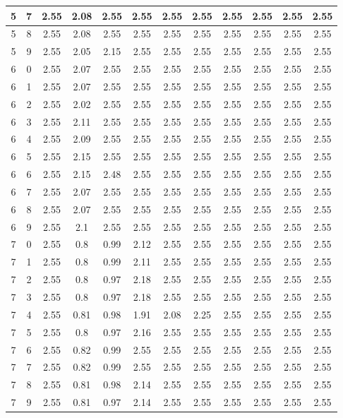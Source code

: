 \begin{longtable}{|c|c||c||c|c|c|c|c||c|c|c|c|}
	5 & 7 & 2.55 & 2.08 & 2.55 & 2.55 & 2.55 & 2.55 & 2.55 & 2.55 & 2.55 & 2.55 \\ \hline
	5 & 8 & 2.55 & 2.08 & 2.55 & 2.55 & 2.55 & 2.55 & 2.55 & 2.55 & 2.55 & 2.55 \\ \hline
	5 & 9 & 2.55 & 2.05 & 2.15 & 2.55 & 2.55 & 2.55 & 2.55 & 2.55 & 2.55 & 2.55 \\ \hline
	6 & 0 & 2.55 & 2.07 & 2.55 & 2.55 & 2.55 & 2.55 & 2.55 & 2.55 & 2.55 & 2.55 \\ \hline
	6 & 1 & 2.55 & 2.07 & 2.55 & 2.55 & 2.55 & 2.55 & 2.55 & 2.55 & 2.55 & 2.55 \\ \hline
	6 & 2 & 2.55 & 2.02 & 2.55 & 2.55 & 2.55 & 2.55 & 2.55 & 2.55 & 2.55 & 2.55 \\ \hline
	6 & 3 & 2.55 & 2.11 & 2.55 & 2.55 & 2.55 & 2.55 & 2.55 & 2.55 & 2.55 & 2.55 \\ \hline
	6 & 4 & 2.55 & 2.09 & 2.55 & 2.55 & 2.55 & 2.55 & 2.55 & 2.55 & 2.55 & 2.55 \\ \hline
	6 & 5 & 2.55 & 2.15 & 2.55 & 2.55 & 2.55 & 2.55 & 2.55 & 2.55 & 2.55 & 2.55 \\ \hline
	6 & 6 & 2.55 & 2.15 & 2.48 & 2.55 & 2.55 & 2.55 & 2.55 & 2.55 & 2.55 & 2.55 \\ \hline
	6 & 7 & 2.55 & 2.07 & 2.55 & 2.55 & 2.55 & 2.55 & 2.55 & 2.55 & 2.55 & 2.55 \\ \hline
	6 & 8 & 2.55 & 2.07 & 2.55 & 2.55 & 2.55 & 2.55 & 2.55 & 2.55 & 2.55 & 2.55 \\ \hline
	6 & 9 & 2.55 & 2.1 & 2.55 & 2.55 & 2.55 & 2.55 & 2.55 & 2.55 & 2.55 & 2.55 \\ \hline
	7 & 0 & 2.55 & 0.8 & 0.99 & 2.12 & 2.55 & 2.55 & 2.55 & 2.55 & 2.55 & 2.55 \\ \hline
	7 & 1 & 2.55 & 0.8 & 0.99 & 2.11 & 2.55 & 2.55 & 2.55 & 2.55 & 2.55 & 2.55 \\ \hline
	7 & 2 & 2.55 & 0.8 & 0.97 & 2.18 & 2.55 & 2.55 & 2.55 & 2.55 & 2.55 & 2.55 \\ \hline
	7 & 3 & 2.55 & 0.8 & 0.97 & 2.18 & 2.55 & 2.55 & 2.55 & 2.55 & 2.55 & 2.55 \\ \hline
	7 & 4 & 2.55 & 0.81 & 0.98 & 1.91 & 2.08 & 2.25 & 2.55 & 2.55 & 2.55 & 2.55 \\ \hline
	7 & 5 & 2.55 & 0.8 & 0.97 & 2.16 & 2.55 & 2.55 & 2.55 & 2.55 & 2.55 & 2.55 \\ \hline
	7 & 6 & 2.55 & 0.82 & 0.99 & 2.55 & 2.55 & 2.55 & 2.55 & 2.55 & 2.55 & 2.55 \\ \hline
	7 & 7 & 2.55 & 0.82 & 0.99 & 2.55 & 2.55 & 2.55 & 2.55 & 2.55 & 2.55 & 2.55 \\ \hline
	7 & 8 & 2.55 & 0.81 & 0.98 & 2.14 & 2.55 & 2.55 & 2.55 & 2.55 & 2.55 & 2.55 \\ \hline
	7 & 9 & 2.55 & 0.81 & 0.97 & 2.14 & 2.55 & 2.55 & 2.55 & 2.55 & 2.55 & 2.55 \\ \hline
\end{longtable}
